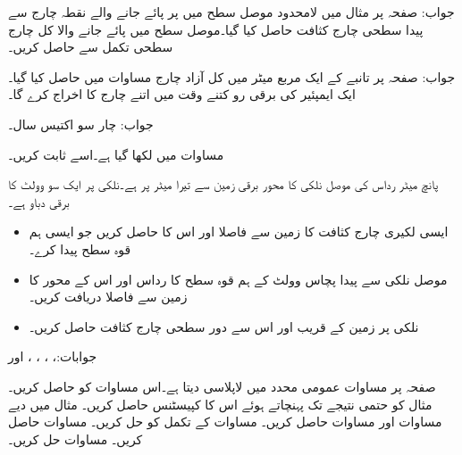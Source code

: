 جواب: 
صفحہ  پر مثال  میں لامحدود موصل سطح  میں  پر پائے جانے والے نقطہ چارج  سے پیدا سطحی چارج کثافت  حاصل کیا گیا۔موصل سطح میں پائے جانے والا کل چارج سطحی تکمل سے حاصل کریں۔

جواب:  
صفحہ  پر تانبے کے ایک مربع میٹر میں کل آزاد چارج مساوات  میں حاصل کیا گیا۔ایک ایمپئیر کی برقی رو کتنے وقت میں اتنے چارج کا اخراج کرے گا۔

جواب: چار سو اکتیس  سال۔ 

مساوات  میں   لکھا گیا ہے۔اسے ثابت کریں۔

پانچ میٹر رداس کی موصل نلکی کا محور برقی زمین سے تیرا میٹر پر ہے۔نلکی پر ایک سو وولٹ کا برقی دباو ہے۔
\begin{itemize}
\item
ایسی لکیری چارج کثافت کا زمین سے فاصلا اور اس کا  حاصل کریں جو ایسی ہم قوہ سطح  پیدا کرے۔
\item
موصل نلکی سے پیدا پچاس وولٹ کے ہم قوہ سطح کا رداس اور اس کے محور کا زمین سے فاصلا دریافت کریں۔
\item
نلکی پر زمین کے قریب اور اس سے دور سطحی چارج کثافت حاصل کریں۔
\end{itemize} 

جوابات:، ، ، ،  اور 

صفحہ  پر مساوات  عمومی محدد میں لاپلاسی دیتا ہے۔اس مساوات کو حاصل کریں۔
مثال  کو حتمی نتیجے تک پہنچاتے ہوئے اس  کا کپیسٹنس حاصل کریں۔
مثال  میں دیے مساوات  اور مساوات  حاصل کریں۔
مساوات  کے تکمل کو حل کریں۔
مساوات  حاصل کریں۔
مساوات  حل کریں۔
